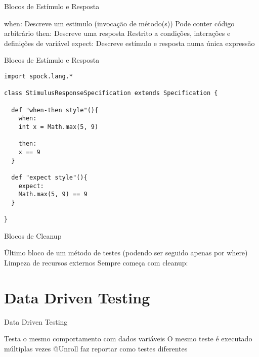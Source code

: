 \documentclass{beamer}
\begin{document}
\begin{frame}{Blocos de Estímulo e Resposta}
 \begin{outline}
    \alert{when:}
     Descreve um estimulo (invocação de método(s))
     Pode conter código arbitrário
    \alert{then:}
     Descreve uma resposta
     Restrito a condições, interações e definições de variável
    \alert{expect:}
     Descreve estímulo e resposta numa única expressão
  \0
  \0
 \end{outline}
\end{frame}

\begin{frame}[fragile]{Blocos de Estímulo e Resposta}
 \begin{verbatim}
import spock.lang.*

class StimulusResponseSpecification extends Specification {

  def "when-then style"(){
    when:
    int x = Math.max(5, 9)
    
    then:
    x == 9
  }
  
  def "expect style"(){
    expect:
    Math.max(5, 9) == 9
  }
  
}
  \end{verbatim}
\end{frame}

\begin{frame}{Blocos de Cleanup}
 \begin{outline}
    Último bloco de um método de testes (podendo ser seguido apenas por where)
    Limpeza de recursos externos
    Sempre começa com \alert{cleanup:}
 \end{outline}
\end{frame}

\section{Data Driven Testing}

\begin{frame}{Data Driven Testing}
 \begin{outline}
    Testa o mesmo comportamento com dados variáveis
    O mesmo teste é executado múltiplas vezes
    @Unroll faz reportar como testes diferentes
 \end{outline}
\end{frame}
\end{document}
